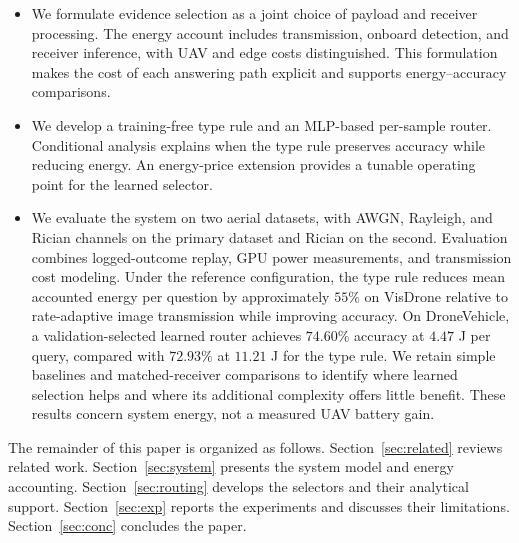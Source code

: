 \begin{itemize}
\item We formulate evidence selection as a joint choice of payload and
  receiver processing. The energy account includes transmission,
  onboard detection, and receiver inference, with UAV and edge costs
  distinguished. This formulation makes the cost of each answering path
  explicit and supports energy--accuracy comparisons.
\item We develop a training-free type rule and an MLP-based per-sample
  router. Conditional analysis explains when the type rule
  preserves accuracy while reducing energy. An energy-price extension
  provides a tunable operating point for the learned selector.
\item We evaluate the system on two aerial datasets, with AWGN,
  Rayleigh, and Rician channels on the primary dataset and Rician on
  the second. Evaluation combines logged-outcome replay, GPU power
  measurements, and transmission cost modeling. Under the reference
  configuration, the type rule reduces mean accounted energy per question by
  approximately $55\%$ on VisDrone relative to rate-adaptive image
  transmission while improving accuracy. On DroneVehicle, a
  validation-selected learned router achieves $74.60\%$ accuracy
  at $4.47$ J per query, compared with $72.93\%$ at $11.21$ J
  for the type rule. We retain simple baselines and matched-receiver
  comparisons to identify where learned selection helps and where
  its additional complexity offers little benefit. These results
  concern system energy, not a measured UAV battery gain.
\end{itemize}

The remainder of this paper is organized as follows.
Section~\ref{sec:related} reviews related work.
Section~\ref{sec:system} presents the system model and energy accounting.
Section~\ref{sec:routing} develops the selectors and their analytical
support. Section~\ref{sec:exp} reports the experiments and discusses
their limitations. Section~\ref{sec:conc} concludes the paper.
